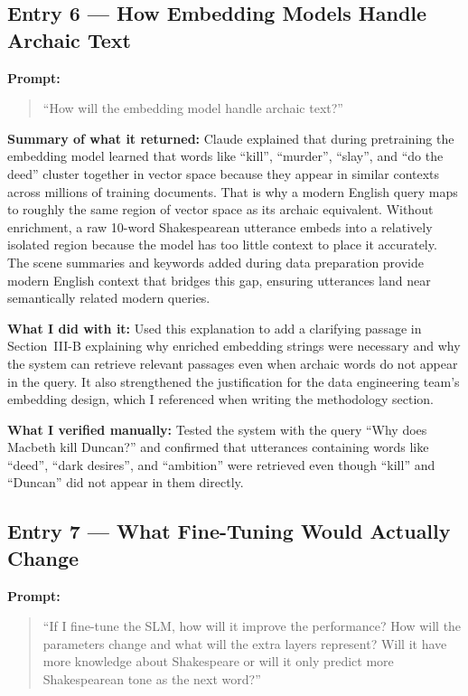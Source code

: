 \documentclass[10pt,conference]{IEEEtran}
\begin{document}
\subsection*{Entry 6 --- How Embedding Models Handle Archaic Text}

\textbf{Prompt:}
\begin{quote}
``How will the embedding model handle archaic text?''
\end{quote}

\textbf{Summary of what it returned:}
Claude explained that during pretraining the embedding model learned
that words like ``kill'', ``murder'', ``slay'', and ``do the deed''
cluster together in vector space because they appear in similar
contexts across millions of training documents. That is why a modern
English query maps to roughly the same region of vector space as its
archaic equivalent. Without enrichment, a raw 10-word Shakespearean
utterance embeds into a relatively isolated region because the model
has too little context to place it accurately. The scene summaries and
keywords added during data preparation provide modern English context
that bridges this gap, ensuring utterances land near semantically
related modern queries.

\textbf{What I did with it:}
Used this explanation to add a clarifying passage in Section~III-B
explaining why enriched embedding strings were necessary and why the
system can retrieve relevant passages even when archaic words do not
appear in the query. It also strengthened the justification for the
data engineering team's embedding design, which I referenced when
writing the methodology section.

\textbf{What I verified manually:}
Tested the system with the query ``Why does Macbeth kill Duncan?'' and
confirmed that utterances containing words like ``deed'', ``dark
desires'', and ``ambition'' were retrieved even though ``kill'' and
``Duncan'' did not appear in them directly.

\subsection*{Entry 7 --- What Fine-Tuning Would Actually Change}

\textbf{Prompt:}
\begin{quote}
``If I fine-tune the SLM, how will it improve the performance?
How will the parameters change and what will the extra layers represent?
Will it have more knowledge about Shakespeare or will it only predict
more Shakespearean tone as the next word?''
\end{quote}
\end{document}
